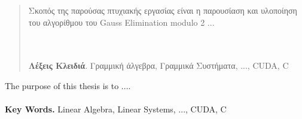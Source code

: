 \begin{abstract}
Σκοπός της παρούσας πτυχιακής εργασίας είναι η παρουσίαση και υλοποίηση του αλγορίθμου του {\lt Gauss Elimination modulo 2} ...

\ \\\\
{\bf Λέξεις Κλειδιά}.
    Γραμμική άλγεβρα, Γραμμικά Συστήματα, ..., {\lt CUDA, C} 
\end{abstract}    
\newpage
{\latintext
\begin{center}
{}
\end{center}
{\small
	{\lt The purpose of this thesis is to ....}
	\ \\\\
{\bf Key Words.} Linear Algebra, Linear Systems, ..., CUDA, C 
}}